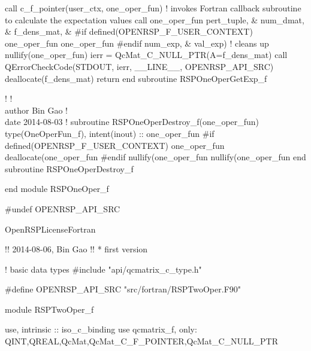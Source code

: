         call c_f_pointer(user_ctx, one_oper_fun)
        ! invokes Fortran callback subroutine to calculate the expectation values
        call one_oper_fun%
                                           pert_tuple,            &
                                           num_dmat,              &
                                           f_dens_mat,            &
#if defined(OPENRSP_F_USER_CONTEXT)
                                           one_oper_fun%
                                           one_oper_fun%
#endif
                                           num_exp,               &
                                           val_exp)
        ! cleans up
        nullify(one_oper_fun)
        ierr = QcMat_C_NULL_PTR(A=f_dens_mat)
        call QErrorCheckCode(STDOUT, ierr, __LINE__, OPENRSP_API_SRC)
        deallocate(f_dens_mat)
        return
    end subroutine RSPOneOperGetExp_f

    !%
    !  \\author Bin Gao
    !  \\date 2014-08-03
    !%
    subroutine RSPOneOperDestroy_f(one_oper_fun)
        type(OneOperFun_f), intent(inout) :: one_oper_fun
#if defined(OPENRSP_F_USER_CONTEXT)
        one_oper_fun%
        deallocate(one_oper_fun%
#endif
        nullify(one_oper_fun%
        nullify(one_oper_fun%
    end subroutine RSPOneOperDestroy_f

end module RSPOneOper_f

#undef OPENRSP_API_SRC

\nwendcode{}\endmoddef
\LA{}OpenRSPLicenseFortran~{\nwtagstyle{}}\RA{}

!!  2014-08-06, Bin Gao
!!  * first version

! basic data types
#include "api/qcmatrix_c_type.h"

#define OPENRSP_API_SRC "src/fortran/RSPTwoOper.F90"

module RSPTwoOper_f

    use, intrinsic :: iso_c_binding
    use qcmatrix_f, only: QINT,QREAL,QcMat,QcMat_C_F_POINTER,QcMat_C_NULL_PTR

